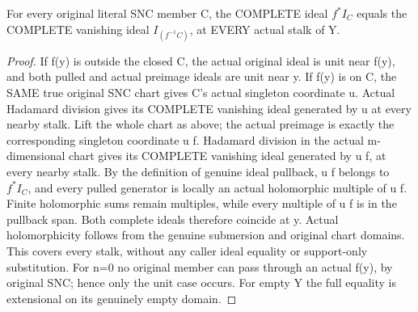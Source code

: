 \begin{theorem}
\label{hir:submersion-nc-whole-member-ideal}
\leanok
For every original literal SNC member C, the COMPLETE ideal $f^* I_C$ equals
the COMPLETE vanishing ideal $I_{(f^{-1}C)}$, at EVERY actual stalk of Y.
\end{theorem}
\begin{proof}
If f(y) is outside the closed C, the actual original ideal is unit near
f(y), and both pulled and actual preimage ideals are unit near y. If f(y)
is on C, the SAME true original SNC chart gives C's actual singleton
coordinate u. Actual Hadamard division gives its COMPLETE vanishing ideal
generated by u at every nearby stalk. Lift the whole chart as above; the
actual preimage is exactly the corresponding singleton coordinate u f.
Hadamard division in the actual m-dimensional chart gives its COMPLETE
vanishing ideal generated by u f, at every nearby stalk. By the definition
of genuine ideal pullback, u f belongs to $f^*I_C$, and every pulled generator
is locally an actual holomorphic multiple of u f. Finite holomorphic sums
remain multiples, while every multiple of u f is in the pullback span.
Both complete ideals therefore coincide at y. Actual holomorphicity follows
from the genuine submersion and original chart domains. This covers every
stalk, without any caller ideal equality or support-only substitution.
For n=0 no original member can pass through an actual f(y), by original
SNC; hence only the unit case occurs. For empty Y the full equality is
extensional on its genuinely empty domain.
\end{proof}

